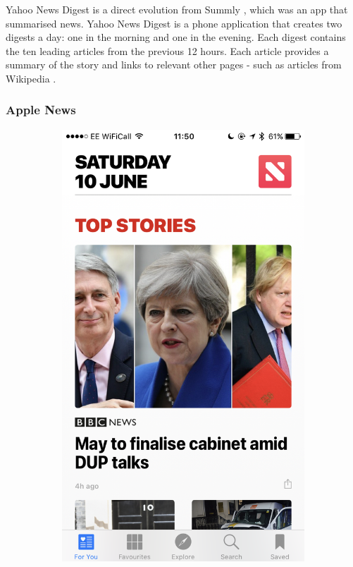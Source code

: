 \documentclass[12pt]{article}
\begin{document}
Yahoo News Digest \cite{yahooNewsDigest} is a direct evolution from Summly \cite{summly}, which was an app that summarised news. Yahoo News Digest is a phone application that creates two digests a day: one in the morning and one in the evening. Each digest contains the ten leading articles from the previous 12 hours. Each article provides a summary of the story and links to relevant other pages - such as articles from Wikipedia \cite{wikipedia}.

\subsubsection{Apple News}

\begin{figure}[ht!]
  \centering
  \begin{subfigure}[t]{0.3\textwidth}
        \includegraphics[width=\textwidth]{AppleHome.PNG}

\end{subfigure}
\end{figure}
\end{document}
